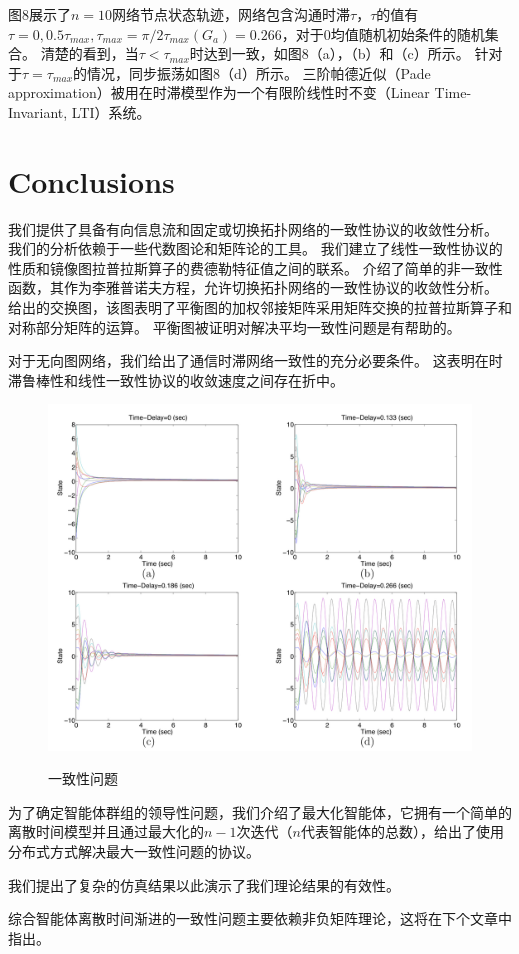 \documentclass{article}
\begin{document}
图8展示了$n=10$网络节点状态轨迹，网络包含沟通时滞$\tau$，$\tau$的值有$\tau=0, 0.5\tau_{max}, \tau_{max} = \pi / 2\tau_{max}(G_a) = 0.266$，对于0均值随机初始条件的随机集合。
清楚的看到，当$\tau < \tau_{max}$时达到一致，如图8（a），（b）和（c）所示。
针对于$\tau = \tau_{max}$的情况，同步振荡如图8（d）所示。
三阶帕德近似（Pade approximation）被用在时滞模型作为一个有限阶线性时不变（Linear Time-Invariant, LTI）系统。

\section{Conclusions}
我们提供了具备有向信息流和固定或切换拓扑网络的一致性协议的收敛性分析。
我们的分析依赖于一些代数图论和矩阵论的工具。
我们建立了线性一致性协议的性质和镜像图拉普拉斯算子的费德勒特征值之间的联系。
介绍了简单的非一致性函数，其作为李雅普诺夫方程，允许切换拓扑网络的一致性协议的收敛性分析。
给出的交换图，该图表明了平衡图的加权邻接矩阵采用矩阵交换的拉普拉斯算子和对称部分矩阵的运算。
平衡图被证明对解决平均一致性问题是有帮助的。

对于无向图网络，我们给出了通信时滞网络一致性的充分必要条件。
这表明在时滞鲁棒性和线性一致性协议的收敛速度之间存在折中。
\begin{figure}[htbp]
    \centering
    \includegraphics[width=14.5cm]{figures/Fig8-ConsensusProblem.jpeg}
    \label{ConsensusProblem}
    \caption{一致性问题}
\end{figure}

为了确定智能体群组的领导性问题，我们介绍了最大化智能体，它拥有一个简单的离散时间模型并且通过最大化的$n-1$次迭代（$n$代表智能体的总数），给出了使用分布式方式解决最大一致性问题的协议。

我们提出了复杂的仿真结果以此演示了我们理论结果的有效性。

综合智能体离散时间渐进的一致性问题主要依赖非负矩阵理论，这将在下个文章中指出。
\end{document}
